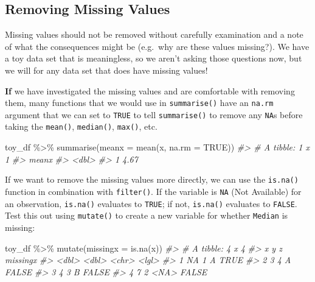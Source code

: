 \documentclass[
]{book}
\newenvironment{Shaded}{\begin{snugshade}}{\end{snugshade}}
\newcommand{\AttributeTok}[1]{\textcolor[rgb]{0.77,0.63,0.00}{#1}}
\newcommand{\CommentTok}[1]{\textcolor[rgb]{0.56,0.35,0.01}{\textit{#1}}}
\newcommand{\ConstantTok}[1]{\textcolor[rgb]{0.00,0.00,0.00}{#1}}
\newcommand{\FunctionTok}[1]{\textcolor[rgb]{0.00,0.00,0.00}{#1}}
\newcommand{\NormalTok}[1]{#1}
\newcommand{\SpecialCharTok}[1]{\textcolor[rgb]{0.00,0.00,0.00}{#1}}
\begin{document}
\hypertarget{removing-missing-values}{%
\subsection{Removing Missing Values}\label{removing-missing-values}}

Missing values should not be removed without carefully examination and a note of what the consequences might be (e.g.~why are these values missing?). We have a toy data set that is meaningless, so we aren't asking those questions now, but we will for any data set that does have missing values!

\textbf{If} we have investigated the missing values and are comfortable with removing them, many functions that we would use in \texttt{summarise()} have an \texttt{na.rm} argument that we can set to \texttt{TRUE} to tell \texttt{summarise()} to remove any \texttt{NA}s before taking the \texttt{mean()}, \texttt{median()}, \texttt{max()}, etc.

\begin{Shaded}
\begin{Highlighting}[]
\NormalTok{toy\_df }\SpecialCharTok{\%\textgreater{}\%} \FunctionTok{summarise}\NormalTok{(}\AttributeTok{meanx =} \FunctionTok{mean}\NormalTok{(x, }\AttributeTok{na.rm =} \ConstantTok{TRUE}\NormalTok{))}
\CommentTok{\#\textgreater{} \# A tibble: 1 x 1}
\CommentTok{\#\textgreater{}   meanx}
\CommentTok{\#\textgreater{}   \textless{}dbl\textgreater{}}
\CommentTok{\#\textgreater{} 1  4.67}
\end{Highlighting}
\end{Shaded}

If we want to remove the missing values more directly, we can use the \texttt{is.na()} function in combination with \texttt{filter()}. If the variable is \texttt{NA} (Not Available) for an observation, \texttt{is.na()} evaluates to \texttt{TRUE}; if not, \texttt{is.na()} evaluates to \texttt{FALSE}. Test this out using \texttt{mutate()} to create a new variable for whether \texttt{Median} is missing:

\begin{Shaded}
\begin{Highlighting}[]
\NormalTok{toy\_df }\SpecialCharTok{\%\textgreater{}\%} \FunctionTok{mutate}\NormalTok{(}\AttributeTok{missingx =} \FunctionTok{is.na}\NormalTok{(x))}
\CommentTok{\#\textgreater{} \# A tibble: 4 x 4}
\CommentTok{\#\textgreater{}       x     y z     missingx}
\CommentTok{\#\textgreater{}   \textless{}dbl\textgreater{} \textless{}dbl\textgreater{} \textless{}chr\textgreater{} \textless{}lgl\textgreater{}   }
\CommentTok{\#\textgreater{} 1    NA     1 A     TRUE    }
\CommentTok{\#\textgreater{} 2     3     4 A     FALSE   }
\CommentTok{\#\textgreater{} 3     4     3 B     FALSE   }
\CommentTok{\#\textgreater{} 4     7     2 \textless{}NA\textgreater{}  FALSE}
\end{Highlighting}
\end{Shaded}
\end{document}
